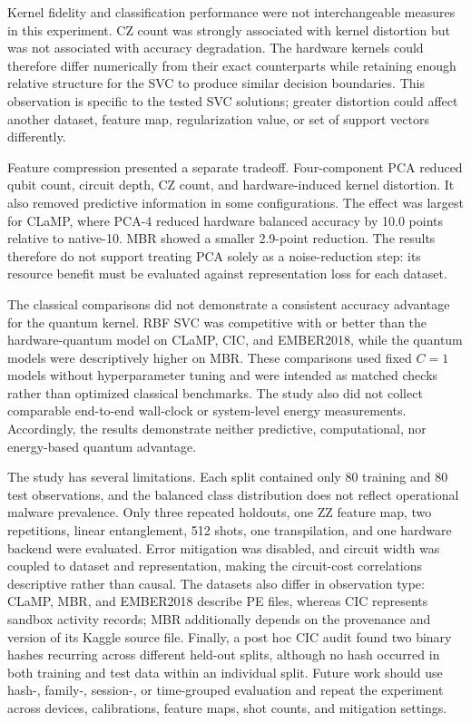 \documentclass[letterpaper]{article} %
\begin{document}
Kernel fidelity and classification performance were not interchangeable measures in this experiment. CZ count was strongly associated with kernel distortion but was not associated with accuracy degradation. The hardware kernels could therefore differ numerically from their exact counterparts while retaining enough relative structure for the SVC to produce similar decision boundaries. This observation is specific to the tested SVC solutions; greater distortion could affect another dataset, feature map, regularization value, or set of support vectors differently.

Feature compression presented a separate tradeoff. Four-component PCA reduced qubit count, circuit depth, CZ count, and hardware-induced kernel distortion. It also removed predictive information in some configurations. The effect was largest for CLaMP, where PCA-4 reduced hardware balanced accuracy by 10.0 points relative to native-10. MBR showed a smaller 2.9-point reduction. The results therefore do not support treating PCA solely as a noise-reduction step: its resource benefit must be evaluated against representation loss for each dataset.

The classical comparisons did not demonstrate a consistent accuracy advantage for the quantum kernel. RBF SVC was competitive with or better than the hardware-quantum model on CLaMP, CIC, and EMBER2018, while the quantum models were descriptively higher on MBR. These comparisons used fixed $C=1$ models without hyperparameter tuning and were intended as matched checks rather than optimized classical benchmarks. The study also did not collect comparable end-to-end wall-clock or system-level energy measurements. Accordingly, the results demonstrate neither predictive, computational, nor energy-based quantum advantage.

The study has several limitations. Each split contained only 80 training and 80 test observations, and the balanced class distribution does not reflect operational malware prevalence. Only three repeated holdouts, one ZZ feature map, two repetitions, linear entanglement, 512 shots, one transpilation, and one hardware backend were evaluated. Error mitigation was disabled, and circuit width was coupled to dataset and representation, making the circuit-cost correlations descriptive rather than causal. The datasets also differ in observation type: CLaMP, MBR, and EMBER2018 describe PE files, whereas CIC represents sandbox activity records; MBR additionally depends on the provenance and version of its Kaggle source file. Finally, a post hoc CIC audit found two binary hashes recurring across different held-out splits, although no hash occurred in both training and test data within an individual split. Future work should use hash-, family-, session-, or time-grouped evaluation and repeat the experiment across devices, calibrations, feature maps, shot counts, and mitigation settings.
\end{document}
